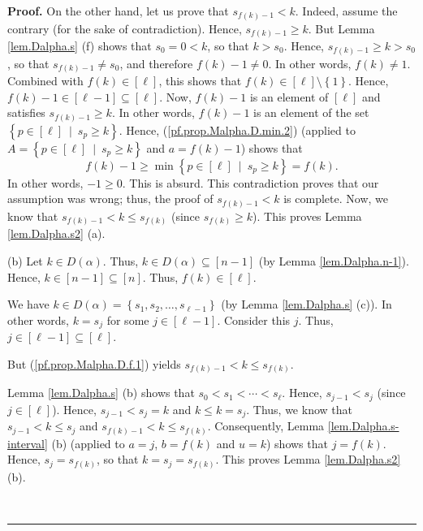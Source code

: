 \documentclass[numbers=enddot,12pt,final,onecolumn,notitlepage,abstracton]{scrartcl}
\theoremstyle{definition}
\newenvironment{proof}[1][Proof]{\noindent\textbf{#1.} }{\ \rule{0.5em}{0.5em}}
\newenvironment{verlong}{}{}
\begin{document}
\begin{verlong}
\begin{footnotesize}
\begin{proof}
On the other hand, let us prove that $s_{f\left(  k\right)  -1}<k$. Indeed,
assume the contrary (for the sake of contradiction). Hence, $s_{f\left(
k\right)  -1}\geq k$. But Lemma \ref{lem.Dalpha.s} (f) shows that $s_{0}=0<k$,
so that $k>s_{0}$. Hence, $s_{f\left(  k\right)  -1}\geq k>s_{0}$, so that
$s_{f\left(  k\right)  -1}\neq s_{0}$, and therefore $f\left(  k\right)
-1\neq0$. In other words, $f\left(  k\right)  \neq1$. Combined with $f\left(
k\right)  \in\left[  \ell\right]  $, this shows that $f\left(  k\right)
\in\left[  \ell\right]  \setminus\left\{  1\right\}  $. Hence, $f\left(
k\right)  -1\in\left[  \ell-1\right]  \subseteq\left[  \ell\right]  $. Now,
$f\left(  k\right)  -1$ is an element of $\left[  \ell\right]  $ and satisfies
$s_{f\left(  k\right)  -1}\geq k$. In other words, $f\left(  k\right)  -1$ is
an element of the set $\left\{  p\in\left[  \ell\right]  \ \mid\ s_{p}\geq
k\right\}  $. Hence, (\ref{pf.prop.Malpha.D.min.2}) (applied to $A=\left\{
p\in\left[  \ell\right]  \ \mid\ s_{p}\geq k\right\}  $ and $a=f\left(
k\right)  -1$) shows that%
\[
f\left(  k\right)  -1\geq\min\left\{  p\in\left[  \ell\right]  \ \mid
\ s_{p}\geq k\right\}  =f\left(  k\right)  .
\]
In other words, $-1\geq0$. This is absurd. This contradiction proves that our
assumption was wrong; thus, the proof of $s_{f\left(  k\right)  -1}<k$ is
complete. Now, we know that $s_{f\left(  k\right)  -1}<k\leq s_{f\left(
k\right)  }$ (since $s_{f\left(  k\right)  }\geq k$). This proves Lemma
\ref{lem.Dalpha.s2} (a).

(b) Let $k\in D\left(  \alpha\right)  $. Thus, $k\in D\left(  \alpha\right)
\subseteq\left[  n-1\right]  $ (by Lemma \ref{lem.Dalpha.n-1}). Hence,
$k\in\left[  n-1\right]  \subseteq\left[  n\right]  $. Thus, $f\left(
k\right)  \in\left[  \ell\right]  $.

We have $k\in D\left(  \alpha\right)  =\left\{  s_{1},s_{2},\ldots,s_{\ell
-1}\right\}  $ (by Lemma \ref{lem.Dalpha.s} (c)). In other words, $k=s_{j}$
for some $j\in\left[  \ell-1\right]  $. Consider this $j$. Thus, $j\in\left[
\ell-1\right]  \subseteq\left[  \ell\right]  $.

But (\ref{pf.prop.Malpha.D.f.1}) yields $s_{f\left(  k\right)  -1}<k\leq
s_{f\left(  k\right)  }$.

Lemma \ref{lem.Dalpha.s} (b) shows that $s_{0}<s_{1}<\cdots<s_{\ell}$. Hence,
$s_{j-1}<s_{j}$ (since $j\in\left[  \ell\right]  $). Hence, $s_{j-1}<s_{j}=k$
and $k\leq k=s_{j}$. Thus, we know that $s_{j-1}<k\leq s_{j}$ and $s_{f\left(
k\right)  -1}<k\leq s_{f\left(  k\right)  }$. Consequently, Lemma
\ref{lem.Dalpha.s-interval} (b) (applied to $a=j$, $b=f\left(  k\right)  $ and
$u=k$) shows that $j=f\left(  k\right)  $. Hence, $s_{j}=s_{f\left(  k\right)
}$, so that $k=s_{j}=s_{f\left(  k\right)  }$. This proves Lemma
\ref{lem.Dalpha.s2} (b).


\end{proof}
\end{footnotesize}
\end{verlong}
\end{document}
